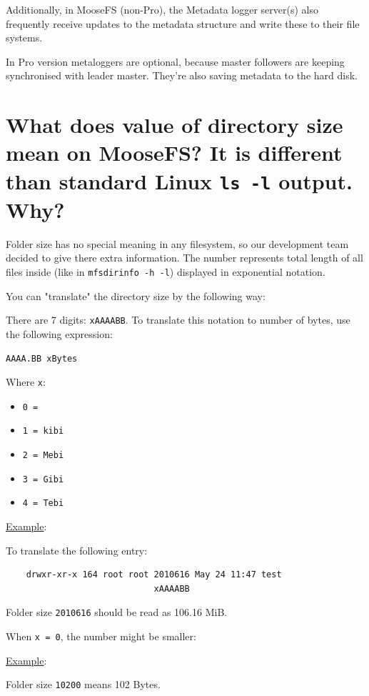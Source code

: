 \documentclass[a4paper,11pt,english]{report}
\def\code#1{\texttt{#1}}
\begin{document}
		Additionally, in MooseFS (non-Pro), the Metadata logger server(s) also frequently receive updates to the metadata structure and write these to their file systems.
		
		In Pro version metaloggers are optional, because master followers are keeping synchronised with leader master. They're also saving metadata to the hard disk.
		
		\section{What does value of directory size mean on MooseFS? It is different than standard Linux \code{ls -l} output. Why?}
		Folder size has no special meaning in any filesystem, so our development team decided to give there extra information. The number represents total length of all files inside (like in \code{mfsdirinfo -h -l}) displayed in exponential notation.

		You can "translate" the directory size by the following way:

		There are 7 digits: \code{xAAAABB}. To translate this notation to number of bytes, use the following expression:

		\code{AAAA.BB xBytes}
		
		Where \code{x}:
		\begin{itemize}
			\item \code{0 =}
			\item \code{1 = kibi}
			\item \code{2 = Mebi}
			\item \code{3 = Gibi}
			\item \code{4 = Tebi}
		\end{itemize}

		\bigskip

		\underline{Example}:
		
		To translate the following entry:
		
		\begin{lstlisting}
	drwxr-xr-x 164 root root 2010616 May 24 11:47 test
	                         xAAAABB
		\end{lstlisting}

		Folder size \code{2010616} should be read as 106.16 MiB.
		
		\bigskip
		
		When \code{x = 0}, the number might be smaller:
		
		\underline{Example}:
		
		Folder size \code{10200} means 102 Bytes.
\end{document}

